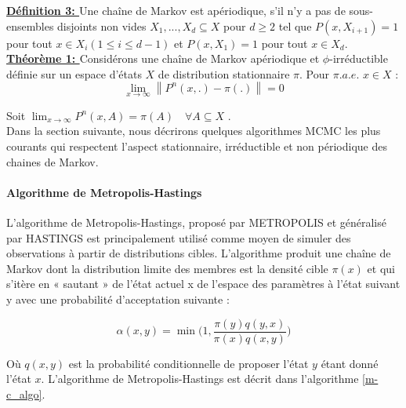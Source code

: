 \noindent \textbf{\underline{Définition 3: }} Une chaîne de Markov est apériodique, s'il n'y a pas de sous-ensembles disjoints non vides \(\displaystyle X_{1},...,X_{d} \subseteq X\) pour \(\displaystyle d \geq 2\) tel que \(\displaystyle P(x,X_{i+1}) = 1\) pour tout \(\displaystyle x \in X_{i} (1\leq i \leq d-1 ) \) et \(\displaystyle P(x,X_{1}) = 1 \) pour tout \(\displaystyle x \in X_{d}\). \\

\noindent \textbf{\underline{Théorème 1: }} Considérons une chaîne de Markov apériodique et \(\displaystyle \phi \)-irréductible définie sur un espace d'états \(\displaystyle X \) de distribution stationnaire \(\displaystyle \pi \). Pour \(\displaystyle \pi.a.e. \) \(\displaystyle x \in X \) :
\begin{equation}
	\lim_{x \to \infty} \left\lVert P^{n}(x,.) - \pi(.) \right\rVert = 0
\end{equation} 

\noindent Soit \(\displaystyle \lim_{x \to \infty} P^{n}(x,A) = \pi(A) \hspace{1em} \forall A \subseteq  X \) . \\
Dans la section suivante, nous décrirons quelques algorithmes MCMC les plus courants qui respectent l’aspect stationnaire, irréductible et non périodique des chaines de Markov.
\paragraph{Algorithme de Metropolis-Hastings}
L’algorithme de Metropolis-Hastings, proposé par METROPOLIS \cite{metropolis1953equation} et généralisé par HASTINGS \cite{hastings1970monte} est principalement utilisé comme moyen de simuler des observations à partir de distributions cibles. L'algorithme produit une chaîne de Markov dont la distribution limite des membres est la densité cible \(\displaystyle \pi(x) \) et qui s’itère en « sautant » de l’état actuel x de l’espace des paramètres à l’état suivant y avec une probabilité d’acceptation suivante :

\begin{equation}
	\alpha(x,y) = \min\Biggl( 1, \frac{\pi(y)q(y,x)}{\pi(x)q(x,y)} \Biggr)
\end{equation}

Où \(\displaystyle q(x,y) \) est la probabilité conditionnelle de proposer l'état \(\displaystyle y \) étant donné l'état \(\displaystyle x \). L'algorithme de Metropolis-Hastings est décrit dans l’algorithme \ref{m-c_algo}.

